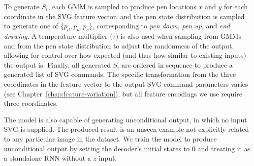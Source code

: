 To generate $S_i$, each GMM is sampled to produce pen locations $x$ and $y$ for each coordinate in the SVG feature vector, and the pen state distribution is sampled to generate one of $\{p_d, p_u, p_e\}$, corresponding to \textit{pen down}, \textit{pen up}, and \textit{end drawing}.
A temperature multiplier ($\tau$) is also used when sampling from GMMs and from the pen state distribution to adjust the randomness of the output, allowing for control over how expected (and thus how similar to existing inputs) the output is.
Finally, all generated $S_i$ are ordered in sequence to produce a generated list of SVG commands. The specific transformation from the three coordinates in the feature vector to the output SVG command parameters varies (see Chapter~\ref{chap:feature-variation}), but all feature encodings we use require three coordinates. 

The model is also capable of generating unconditional output, in which no input SVG is supplied.
The produced result is an unseen example not explicitly related to any particular image in the dataset.
We train the model to produce unconditional output by setting the decoder's initial states to 0 and treating it as a standalone RNN without a $z$ input.
